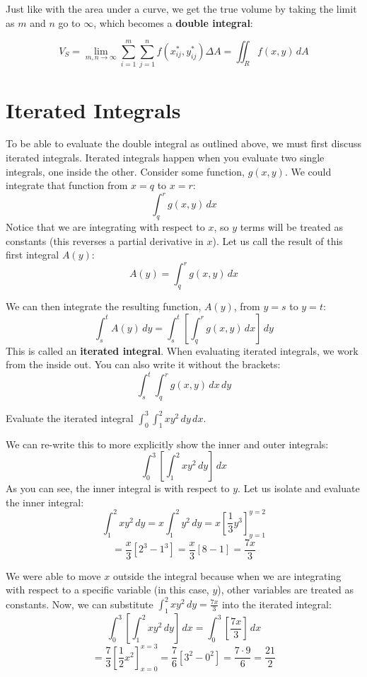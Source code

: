 Just like with the area under a curve, we get the true volume by taking the
limit as $m$ and $n$ go to $\infty$, which becomes a \textbf{double integral}:

\begin{mdframed}[style = important, frametitle = {Volume of a Solid over a 
Region}]
$$V_{\textit{S}} = \lim_{m, n \to \infty} \sum_{i = 1}^m \sum_{j = 1}^n f(x_{ij}^*
, y_{ij}^*) \Delta A = \iint_{\textit{R}} f(x, y)\,dA$$
\end{mdframed}


\section{Iterated Integrals}

To be able to evaluate the double integral as outlined above, we must first 
discuss iterated integrals. Iterated integrals happen when you evaluate two 
single integrals, one inside the other. Consider some function, $g(x, y)$. We 
could integrate that function from $x = q$ to $x = r$:
$$\int_q^r g(x, y)\,dx$$
Notice that we are integrating with respect to $x$, so $y$ terms will be 
treated as constants (this reverses a partial derivative in $x$).
Let us call the result of this first integral $A(y)$:
$$A(y) = \int_q^r g(x, y)\,dx$$

We can then integrate the resulting function, $A(y)$, from $y = s$ to $y = t$:
$$\int_s^t A(y)\,dy = \int_s^t \left[ \int_q^r g(x, y)\,dx \right]\,dy$$
This is called an \textbf{iterated integral}. When 
evaluating iterated integrals, we work from the inside out. You can also write 
it without the brackets:
$$\int_s^t \int_q^r g(x, y)\,dx\,dy$$

\begin{Worked}
\begin{Problem}
Evaluate the iterated integral $\int_0^3 \int_1^2 x y^2\,dy
\,dx$.
\end{Problem}
\begin{Solution}
We can re-write this to more explicitly show the inner and 
outer integrals:
$$\int_0^3 \left[ \int_1^2 x y^2\,dy \right]\,dx$$
As you can see, the inner integral is with respect to $y$. Let us isolate and 
evaluate the inner integral:
$$\int_1^2 x y^2\,dy = x \int_1^2 y^2\,dy = x \left[ \frac{1}{3}y^3 \right]_{y 
= 1}^{y = 2}$$
$$= \frac{x}{3} \left[ 2^3 - 1^3 \right] = \frac{x}{3} \left[ 8 - 1 \right] = 
\frac{7x}{3}$$

We were able to move $x$ outside the integral because when we are integrating 
with respect to a specific variable (in this case, $y$), other variables are 
treated as constants. Now, we can substitute $\int_1^2 xy^2 \,dy = \frac{7x}{3}$
into the iterated integral:
$$\int_0^3 \left[ \int_1^2 x y^2\,dy \right]\,dx = \int_0^3 \left[ \frac{7x}{3}
\right]\,dx$$
$$= \frac{7}{3} \left[ \frac{1}{2}x^2 \right]_{x = 0}^{x = 3} = \frac{7}{6} 
\left[ 3^2 - 0^2 \right] = \frac{7 \cdot 9}{6} = \frac{21}{2}$$
\end{Solution}
\end{Worked}

